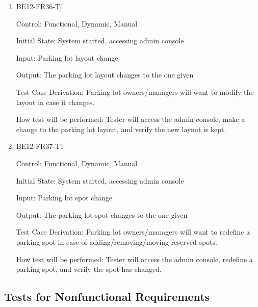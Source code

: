 \documentclass[12pt, titlepage]{article}
\begin{document}
\begin{enumerate}
    \item{BE12-FR36-T1}

    Control: Functional, Dynamic, Manual
    					
    Initial State: System started, accessing admin console
    					
    Input: Parking lot layout change
    					
    Output: The parking lot layout changes to the one given
    
    Test Case Derivation: Parking lot owners/managers will want to modify the
    layout in case it changes.
    					
    How test will be performed: Tester will access the admin console, make a
    change to the parking lot layout, and verify the new layout is kept.

    \item{BE12-FR37-T1}

    Control: Functional, Dynamic, Manual
    					
    Initial State: System started, accessing admin console
    					
    Input: Parking lot spot change
    					
    Output: The parking lot spot changes to the one given
    
    Test Case Derivation: Parking lot owners/managers will want to redefine a
    parking spot in case of adding/removing/moving reserved spots.
    					
    How test will be performed: Tester will access the admin console, redefine a
    parking spot, and verify the spot has changed.

    \end{enumerate}
    
\subsection{Tests for Nonfunctional Requirements}
\label{sec:5.2}


\end{document}
